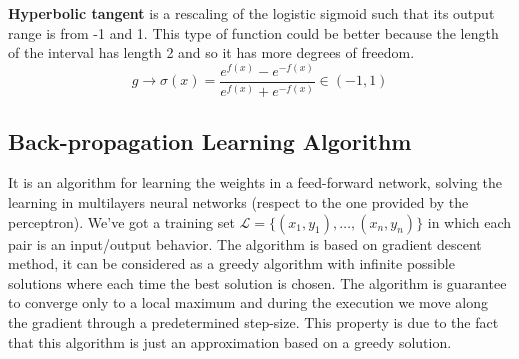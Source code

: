 \textbf{Hyperbolic tangent} is a rescaling of the logistic sigmoid such that its output range is from -1 and 1. This type of function could be better because the length of the interval has length 2 and so it has more degrees of freedom.
$$g \rightarrow \sigma(x) = \frac{e^{f(x)} - e^{-f(x)}}{e^{f(x)} + e^ {-f(x)}} \in (- 1,1)$$

\subsection{Back-propagation Learning Algorithm}
It is an algorithm for learning the weights in a feed-forward network, solving the learning in multilayers neural networks (respect to the one provided by the perceptron). We've got a training set $\mathcal{L} = \{(x_1, y_1), \dots, (x_n,y_n) \}$ in which each pair is an input/output behavior. The algorithm is based on gradient descent method, it can be considered as a greedy algorithm with infinite possible solutions where each time the best solution is chosen. The algorithm is guarantee to converge only to a local maximum and during the execution we move along the gradient through a predetermined step-size. This property is due to the fact that this algorithm is just an approximation based on a greedy solution.

